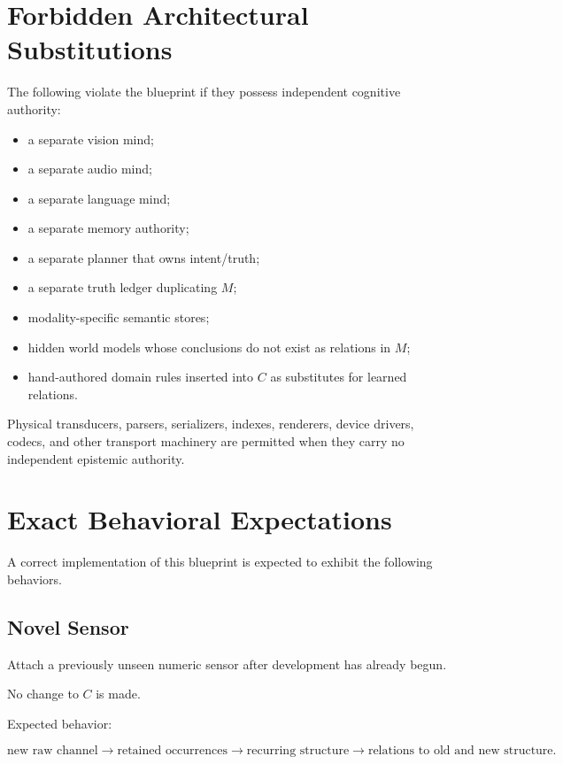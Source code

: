 \documentclass[11pt]{article}
\begin{document}
\section{Forbidden Architectural Substitutions}

The following violate the blueprint if they possess independent cognitive authority:

\begin{itemize}[leftmargin=2em]
    \item a separate vision mind;
    \item a separate audio mind;
    \item a separate language mind;
    \item a separate memory authority;
    \item a separate planner that owns intent/truth;
    \item a separate truth ledger duplicating $M$;
    \item modality-specific semantic stores;
    \item hidden world models whose conclusions do not exist as relations in $M$;
    \item hand-authored domain rules inserted into $C$ as substitutes for learned relations.
\end{itemize}

Physical transducers, parsers, serializers, indexes, renderers, device drivers, codecs, and other transport machinery are permitted when they carry no independent epistemic authority.

\section{Exact Behavioral Expectations}

A correct implementation of this blueprint is expected to exhibit the following behaviors.

\subsection{Novel Sensor}

Attach a previously unseen numeric sensor after development has already begun.

No change to $C$ is made.

Expected behavior:

\[
\text{new raw channel}
\rightarrow
\text{retained occurrences}
\rightarrow
\text{recurring structure}
\rightarrow
\text{relations to old and new structure}.
\]
\end{document}
